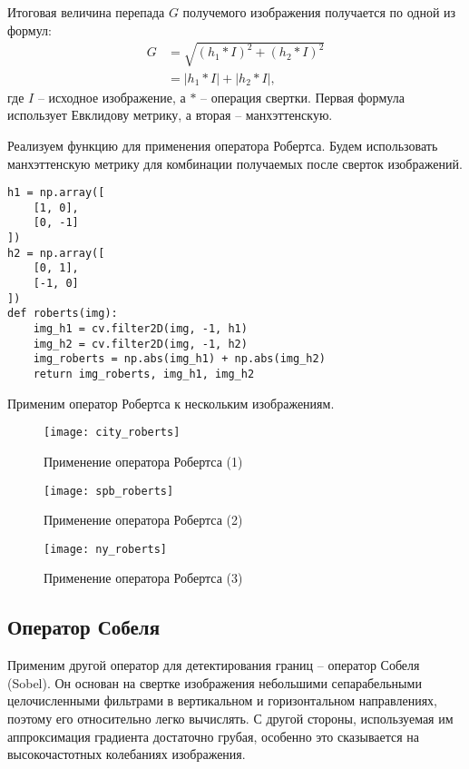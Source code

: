 Итоговая величина перепада $G$ получемого изображения получается по одной из формул:
\begin{align*}
G &= \sqrt{(h_1 * I) ^ 2 + (h_2 * I) ^ 2}\\
  &= \left| h_1 * I \right| + \left| h_2 * I \right|,
\end{align*}
где $I$ -- исходное изображение, а $*$ -- операция свертки. Первая формула использует Евклидову метрику, а вторая -- манхэттенскую.

Реализуем функцию для применения оператора Робертса. Будем использовать манхэттенскую метрику для комбинации получаемых после сверток изображений.

\begin{lstlisting}[caption={Фунукция для применения оператора Робертса}]
h1 = np.array([
    [1, 0],
    [0, -1]
])
h2 = np.array([
    [0, 1],
    [-1, 0]
])
def roberts(img):
    img_h1 = cv.filter2D(img, -1, h1)
    img_h2 = cv.filter2D(img, -1, h2)
    img_roberts = np.abs(img_h1) + np.abs(img_h2)
    return img_roberts, img_h1, img_h2
\end{lstlisting}

Применим оператор Робертса к нескольким изображениям.

\begin{figure}[H]
	\centering
	\texttt{[image: city\_roberts]}
	\caption{Применение оператора Робертса (1)}
\end{figure}

\begin{figure}[H]
	\centering
	\texttt{[image: spb\_roberts]}
	\caption{Применение оператора Робертса (2)}
\end{figure}

\begin{figure}[H]
	\centering
	\texttt{[image: ny\_roberts]}
	\caption{Применение оператора Робертса (3)}
\end{figure}

\newpage

\subsection{Оператор Собеля}

Применим другой оператор для детектирования границ -- оператор Собеля (Sobel). Он основан на свертке изображения небольшими сепарабельными целочисленными фильтрами в вертикальном и горизонтальном направлениях, поэтому его относительно легко вычислять. С другой стороны, используемая им аппроксимация градиента достаточно грубая, особенно это сказывается на высокочастотных колебаниях изображения.

